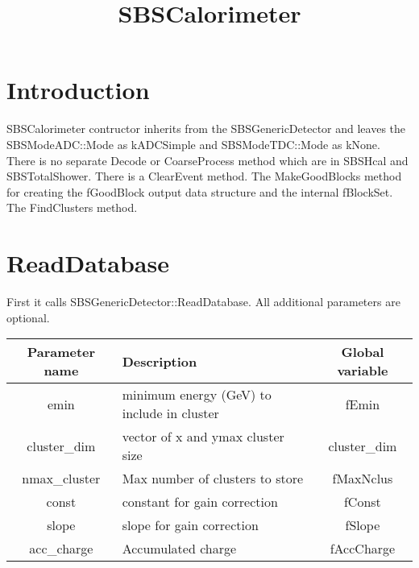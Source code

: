 \documentclass[11pt]{article}
\begin{document}
\title{SBSCalorimeter}
\maketitle

\section{Introduction}
SBSCalorimeter contructor inherits from the SBSGenericDetector and leaves the SBSModeADC::Mode as kADCSimple
and SBSModeTDC::Mode as  kNone.
There is no separate Decode or CoarseProcess  method which are in  SBSHcal and SBSTotalShower.
There is a ClearEvent method.
The MakeGoodBlocks method for creating the fGoodBlock output data structure and the internal fBlockSet.
The FindClusters method.

\section{ReadDatabase}
First it calls SBSGenericDetector::ReadDatabase.
All additional parameters are optional.
\begin{table}[h]
\begin{center}
\begin{tabularx}{\textwidth}{|c|X|c|}
		\hline 
Parameter name	& Description &  Global variable\\ 
\hline
emin & minimum energy (GeV) to include in cluster & fEmin \\
\hline
cluster\_dim &  vector of x and ymax cluster size &  cluster\_dim \\
\hline
nmax\_cluster & Max number of clusters to store & fMaxNclus \\
\hline 
const & constant for gain correction & fConst \\
\hline 
slope & slope for gain correction & fSlope \\
\hline 
acc\_charge & Accumulated charge & fAccCharge \\
\hline
\end{tabularx} 
\end{center}
\end{table}
\end{document}
